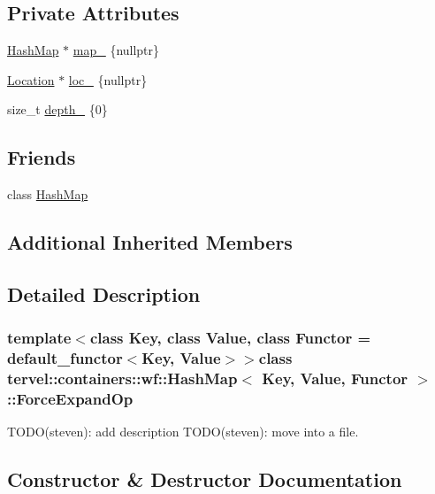 \subsection*{Private Attributes}
\begin{DoxyCompactItemize}
\item 
\hyperlink{classtervel_1_1containers_1_1wf_1_1_hash_map}{Hash\+Map} $\ast$ \hyperlink{classtervel_1_1containers_1_1wf_1_1_hash_map_1_1_force_expand_op_a6d1c762e111e8324c9fcaf56354575e1}{map\+\_\+} \{nullptr\}
\item 
\hyperlink{classtervel_1_1containers_1_1wf_1_1_hash_map_ab2c04cbf19034689a795208e0108fe8a}{Location} $\ast$ \hyperlink{classtervel_1_1containers_1_1wf_1_1_hash_map_1_1_force_expand_op_a4f6bd52ceb03f190143e389f60714a53}{loc\+\_\+} \{nullptr\}
\item 
size\+\_\+t \hyperlink{classtervel_1_1containers_1_1wf_1_1_hash_map_1_1_force_expand_op_a089cd031b862f5bafb70882399148174}{depth\+\_\+} \{0\}
\end{DoxyCompactItemize}
\subsection*{Friends}
\begin{DoxyCompactItemize}
\item 
class \hyperlink{classtervel_1_1containers_1_1wf_1_1_hash_map_1_1_force_expand_op_ab6054287e6f409207af3fa16e49046ad}{Hash\+Map}
\end{DoxyCompactItemize}
\subsection*{Additional Inherited Members}


\subsection{Detailed Description}
\subsubsection*{template$<$class Key, class Value, class Functor = default\+\_\+functor$<$\+Key, Value$>$$>$class tervel\+::containers\+::wf\+::\+Hash\+Map$<$ Key, Value, Functor $>$\+::\+Force\+Expand\+Op}

T\+O\+D\+O(steven)\+: add description T\+O\+D\+O(steven)\+: move into a file. 

\subsection{Constructor \& Destructor Documentation}
\hypertarget{classtervel_1_1containers_1_1wf_1_1_hash_map_1_1_force_expand_op_aa7213b3c1c5d4216eabc96771542f59c}{}
